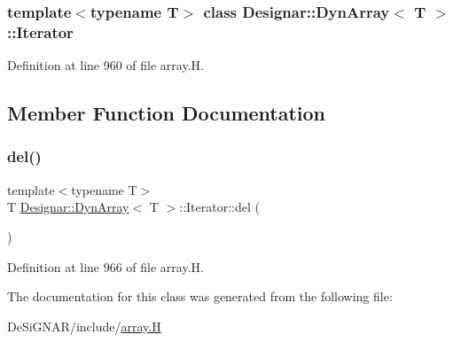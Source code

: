 \subsubsection*{template$<$typename T$>$\newline
class Designar\+::\+Dyn\+Array$<$ T $>$\+::\+Iterator}



Definition at line 960 of file array.\+H.



\subsection{Member Function Documentation}
\mbox{\label{class_designar_1_1_dyn_array_1_1_iterator_a3d700006f23d3c4b63e109edef32410f}} 
\subsubsection{\texorpdfstring{del()}{del()}}
{\footnotesize\ttfamily template$<$typename T$>$ \\
T \hyperlink{class_designar_1_1_dyn_array}{Designar\+::\+Dyn\+Array}$<$ T $>$\+::Iterator\+::del (\begin{DoxyParamCaption}{ }\end{DoxyParamCaption})\hspace{0.3cm}{\ttfamily [inline]}}



Definition at line 966 of file array.\+H.



The documentation for this class was generated from the following file\+:\begin{DoxyCompactItemize}
\item 
De\+Si\+G\+N\+A\+R/include/\hyperlink{array_8_h}{array.\+H}\end{DoxyCompactItemize}
